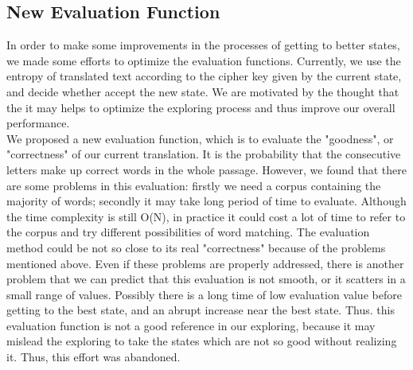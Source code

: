 \documentclass{acmtog} %
\begin{document}
\subsection{New Evaluation Function}
In order to make some improvements in the processes of getting to better states, we made some efforts to optimize the evaluation functions. Currently, we use the entropy of translated text according to the cipher key given by the current state, and decide whether accept the new state. We are motivated by the thought that the it may helps to optimize the exploring process and thus improve our overall performance.\\
We proposed a new evaluation function, which is to evaluate the "goodness", or "correctness" of our current translation. It is the probability that the consecutive letters make up correct words in the whole passage. However, we found that there are some problems in this evaluation: firstly we need a corpus containing the majority of words; secondly it may take long period of time to evaluate. Although the time complexity is still O(N), in practice it could cost a lot of time to refer to the corpus and try different possibilities of word matching. The evaluation method could be not so close to its real "correctness" because of the problems mentioned above. Even if these problems are properly addressed, there is another problem that we can predict that this evaluation is not smooth, or it scatters in a small range of values. Possibly there is a long time of low evaluation value before getting to the best state, and an abrupt increase near the best state. Thus. this evaluation function is not a good reference in our exploring, because it may mislead the exploring to take the states which are not so good  without realizing it. Thus, this effort was abandoned.\\
\label{sec:patterndeformations}
\end{document}

